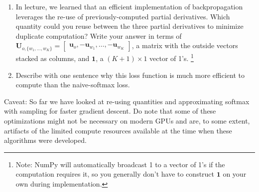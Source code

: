 \documentclass{article}
\begin{document}
\begin{enumerate}
\begin{enumerate}
            \item In lecture, we learned that an efficient implementation of backpropagation leverages the re-use of previously-computed partial derivatives. Which quantity could you reuse between the three partial derivatives to minimize duplicate computation? Write your answer in terms of \\ $\bm{U}_{o, \{w_1, \dots, w_K\}} = \begin{bmatrix}
                                                                                                                                                                                                                                                                                                                                              \bm{u}_o, -\bm{u}_{w_1}, \dots, -\bm{u}_{w_K}
            \end{bmatrix}$, a matrix with the outside vectors stacked as columns, and $\bm{1}$, a $(K + 1) \times 1$ vector of 1's. \footnote{Note: NumPy will automatically broadcast 1 to a vector of 1's if the computation requires it, so you generally don't have to construct $\bm{1}$ on your own during implementation.}

            \item Describe with one sentence why this loss function is much more efficient to compute than the naive-softmax loss.
        \end{enumerate}

        Caveat: So far we have looked at re-using quantities and approximating softmax with sampling for faster gradient descent. Do note that some of these optimizations might not be necessary on modern GPUs and are, to some extent, artifacts of the limited compute resources available at the time when these algorithms were developed.


\end{enumerate}
\end{document}

